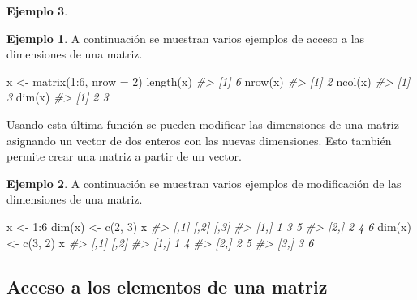 \documentclass[
]{book}
\newenvironment{Shaded}{\begin{snugshade}}{\end{snugshade}}
\newcommand{\AttributeTok}[1]{\textcolor[rgb]{0.77,0.63,0.00}{#1}}
\newcommand{\CommentTok}[1]{\textcolor[rgb]{0.56,0.35,0.01}{\textit{#1}}}
\newcommand{\DecValTok}[1]{\textcolor[rgb]{0.00,0.00,0.81}{#1}}
\newcommand{\FunctionTok}[1]{\textcolor[rgb]{0.00,0.00,0.00}{#1}}
\newcommand{\NormalTok}[1]{#1}
\newcommand{\OtherTok}[1]{\textcolor[rgb]{0.56,0.35,0.01}{#1}}
\newcommand{\SpecialCharTok}[1]{\textcolor[rgb]{0.00,0.00,0.00}{#1}}
\theoremstyle{definition}
\theoremstyle{definition}
\newtheorem{example}{Ejemplo}[chapter]
\theoremstyle{definition}
\theoremstyle{definition}
\theoremstyle{remark}
\begin{document}
\begin{example}
\begin{example}
A continuación se muestran varios ejemplos de acceso a las dimensiones de una matriz.

\begin{Shaded}
\begin{Highlighting}[]
\NormalTok{x }\OtherTok{\textless{}{-}} \FunctionTok{matrix}\NormalTok{(}\DecValTok{1}\SpecialCharTok{:}\DecValTok{6}\NormalTok{, }\AttributeTok{nrow =} \DecValTok{2}\NormalTok{)}
\FunctionTok{length}\NormalTok{(x)}
\CommentTok{\#\textgreater{} [1] 6}
\FunctionTok{nrow}\NormalTok{(x)}
\CommentTok{\#\textgreater{} [1] 2}
\FunctionTok{ncol}\NormalTok{(x)}
\CommentTok{\#\textgreater{} [1] 3}
\FunctionTok{dim}\NormalTok{(x)}
\CommentTok{\#\textgreater{} [1] 2 3}
\end{Highlighting}
\end{Shaded}

\end{example}

Usando esta última función se pueden modificar las dimensiones de una matriz asignando un vector de dos enteros con las nuevas dimensiones. Esto también permite crear una matriz a partir de un vector.

\begin{example}

A continuación se muestran varios ejemplos de modificación de las dimensiones de una matriz.

\begin{Shaded}
\begin{Highlighting}[]
\NormalTok{x }\OtherTok{\textless{}{-}} \DecValTok{1}\SpecialCharTok{:}\DecValTok{6}
\FunctionTok{dim}\NormalTok{(x) }\OtherTok{\textless{}{-}} \FunctionTok{c}\NormalTok{(}\DecValTok{2}\NormalTok{, }\DecValTok{3}\NormalTok{)}
\NormalTok{x}
\CommentTok{\#\textgreater{}      [,1] [,2] [,3]}
\CommentTok{\#\textgreater{} [1,]    1    3    5}
\CommentTok{\#\textgreater{} [2,]    2    4    6}
\FunctionTok{dim}\NormalTok{(x) }\OtherTok{\textless{}{-}} \FunctionTok{c}\NormalTok{(}\DecValTok{3}\NormalTok{, }\DecValTok{2}\NormalTok{)}
\NormalTok{x}
\CommentTok{\#\textgreater{}      [,1] [,2]}
\CommentTok{\#\textgreater{} [1,]    1    4}
\CommentTok{\#\textgreater{} [2,]    2    5}
\CommentTok{\#\textgreater{} [3,]    3    6}
\end{Highlighting}
\end{Shaded}

\end{example}

\hypertarget{acceso-a-los-elementos-de-una-matriz}{%
\subsection{Acceso a los elementos de una matriz}\label{acceso-a-los-elementos-de-una-matriz}}


\end{example}
\end{document}
